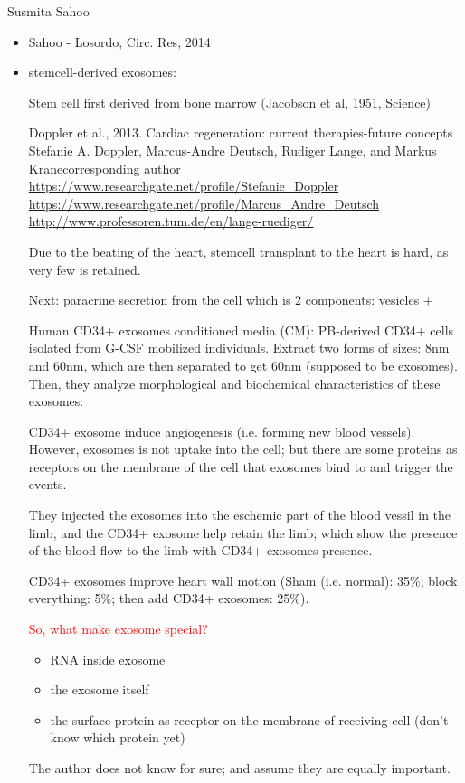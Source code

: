 Susmita Sahoo
\begin{itemize}
  \item Sahoo - Losordo, Circ. Res, 2014
  
  
  \item stemcell-derived exosomes: 

Stem cell first derived from bone marrow (Jacobson et al, 1951, Science)

Doppler et al., 2013. Cardiac regeneration: current therapies-future concepts
Stefanie A. Doppler, Marcus-Andre Deutsch, Rudiger Lange, and Markus
Kranecorresponding author
\url{https://www.researchgate.net/profile/Stefanie_Doppler}
\url{https://www.researchgate.net/profile/Marcus_Andre_Deutsch}
\url{http://www.professoren.tum.de/en/lange-ruediger/}

Due to the beating of the heart, stemcell transplant to the heart is hard, as
very few is retained.

Next: paracrine secretion from the cell which is 2 components: vesicles + 

Human CD34+ exosomes conditioned media (CM):
PB-derived CD34+ cells isolated from G-CSF mobilized individuals.
Extract two forms of sizes: 8nm and 60nm, which are then separated to get 60nm
(supposed to be exosomes). Then, they analyze morphological and biochemical
characteristics of these exosomes.

CD34+ exosome induce angiogenesis (i.e. forming new blood vessels). However,
exosomes is not uptake into the cell; but there are some proteins as receptors
on the membrane of the cell that exosomes bind to and trigger the events.

They injected the exosomes into the eschemic part of the blood vessil in
the limb, and the CD34+ exosome help retain the limb; which show the presence of
the blood flow to the limb with CD34+ exosomes presence.

CD34+ exosomes improve heart wall motion (Sham (i.e. normal): 35\%; block
everything:
5\%; then add CD34+ exosomes: 25\%).


\textcolor{red}{So, what make exosome special?}
\begin{itemize}
  \item RNA inside exosome
  \item the exosome itself
  \item the surface protein as receptor on the membrane of receiving cell
  (don't know which protein yet)
\end{itemize}
The author does not know for sure; and assume they are equally important.


\end{itemize}
